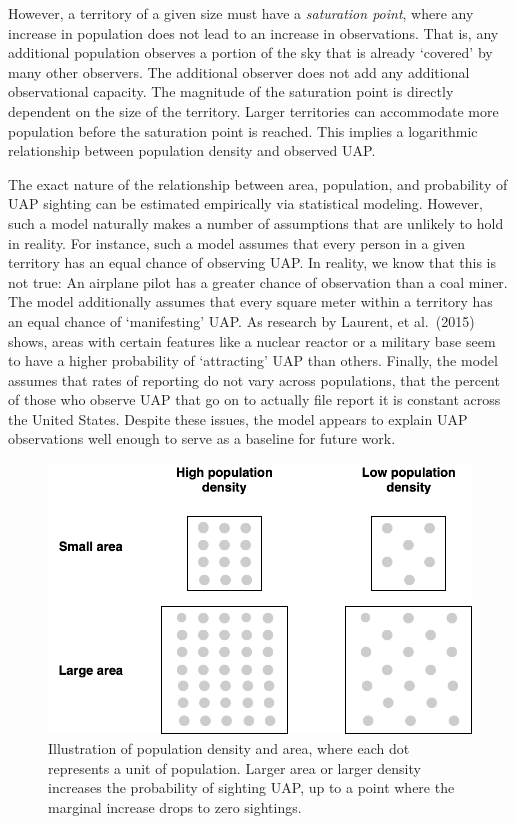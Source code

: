 \documentclass[]{elsarticle} %
\begin{document}
However, a territory of a given size must have a \emph{saturation
point}, where any increase in population does not lead to an increase in
observations. That is, any additional population observes a portion of
the sky that is already `covered' by many other observers. The
additional observer does not add any additional observational capacity.
The magnitude of the saturation point is directly dependent on the size
of the territory. Larger territories can accommodate more population
before the saturation point is reached. This implies a logarithmic
relationship between population density and observed UAP.

The exact nature of the relationship between area, population, and
probability of UAP sighting can be estimated empirically via statistical
modeling. However, such a model naturally makes a number of assumptions
that are unlikely to hold in reality. For instance, such a model assumes
that every person in a given territory has an equal chance of observing
UAP. In reality, we know that this is not true: An airplane pilot has a
greater chance of observation than a coal miner. The model additionally
assumes that every square meter within a territory has an equal chance
of `manifesting' UAP. As research by Laurent, et al.~(2015) shows, areas
with certain features like a nuclear reactor or a military base seem to
have a higher probability of `attracting' UAP than others. Finally, the
model assumes that rates of reporting do not vary across populations,
that the percent of those who observe UAP that go on to actually file
report it is constant across the United States. Despite these issues,
the model appears to explain UAP observations well enough to serve as a
baseline for future work.

\begin{figure}
\includegraphics[width=1\linewidth]{./img/diag} \caption{Illustration of population density and area, where each dot represents a unit of population. Larger area or larger density increases the probability of sighting UAP, up to a point where the marginal increase drops to zero sightings.}\label{fig:unnamed-chunk-2}
\end{figure}
\end{document}
